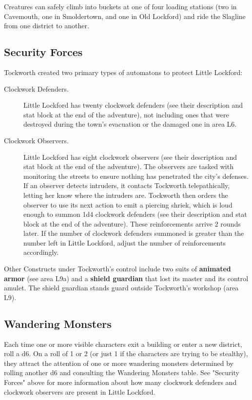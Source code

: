 \documentclass[10pt,a4paper,twoside,bg=print,twocolumn,openany,nodeprecatedcode]{dndbook}
\begin{document}
Creatures can safely climb into buckets at one of four loading stations (two in Cavemouth, one in Smoldertown, and one in Old Lockford) and ride the Slagline from one district to another.

\subsection{Security Forces}
Tockworth created two primary types of automatons to protect Little Lockford:


\begin{description}
\item[Clockwork Defenders.]
Little Lockford has twenty clockwork defenders (see their description and stat block at the end of the adventure), not including ones that were destroyed during the town's evacuation or the damaged one in area L6.
\item[Clockwork Observers.]
Little Lockford has eight clockwork observers (see their description and stat block at the end of the adventure). The observers are tasked with monitoring the streets to ensure nothing has penetrated the city's defenses. If an observer detects intruders, it contacts Tockworth telepathically, letting her know where the intruders are. Tockworth then orders the observer to use its next action to emit a piercing shriek, which is loud enough to summon 1d4 clockwork defenders (see their description and stat block at the end of the adventure). These reinforcements arrive 2 rounds later. If the number of clockwork defenders summoned is greater than the number left in Little Lockford, adjust the number of reinforcements accordingly.
\end{description}

Other Constructs under Tockworth's control include two suits of \textbf{animated armor} (see area L9a) and a \textbf{shield guardian} that lost its master and its control amulet. The shield guardian stands guard outside Tockworth's workshop (area L9).

\subsection{Wandering Monsters}
Each time one or more visible characters exit a building or enter a new district, roll a d6. On a roll of 1 or 2 (or just 1 if the characters are trying to be stealthy), they attract the attention of one or more wandering monsters determined by rolling another d6 and consulting the Wandering Monsters table. See "Security Forces" above for more information about how many clockwork defenders and clockwork observers are present in Little Lockford.
\end{document}
